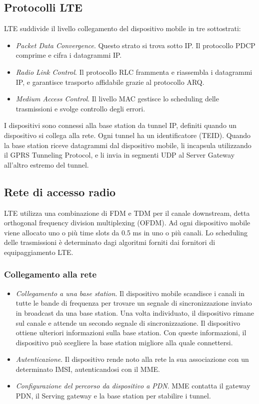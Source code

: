 \documentclass[11pt]{book}
\begin{document}
\subsection{Protocolli LTE}
LTE suddivide il livello collegamento del dispositivo mobile in tre sottostrati:
\begin{itemize}
    \item \textit{Packet Data Convergence}. Questo strato si trova sotto IP. Il protocollo PDCP comprime e cifra i datagrammi 
    IP.
    \item \textit{Radio Link Control}. Il protocollo RLC frammenta e riassembla i datagrammi IP, e garantisce trasporto 
    affidabile grazie al protocollo ARQ. 
    \item \textit{Medium Access Control}. Il livello MAC gestisce lo scheduling delle trasmissioni e svolge controllo degli 
    errori.
\end{itemize}
I dispositivi sono connessi alla base station da tunnel IP, definiti quando un dispositivo si collega alla rete. Ogni tunnel 
ha un identificatore (TEID). Quando la base station riceve datagrammi dal dispositivo mobile, li incapsula utilizzando il 
GPRS Tunneling Protocol, e li invia in segmenti UDP al Server Gateway all'altro estremo del tunnel.
\subsection{Rete di accesso radio}
LTE utilizza una combinazione di FDM e TDM per il canale downstream, detta orthogonal frequency division multiplexing (OFDM). 
Ad ogni dispositivo mobile viene allocato uno o più time slots da 0.5 ms in uno o più canali. Lo scheduling delle trasmissioni 
è determinato dagi algoritmi forniti dai fornitori di equipaggiamento LTE.
\subsubsection{Collegamento alla rete}
\begin{itemize}
    \item \textit{Collegamento a una base station}. Il dispositivo mobile scandisce i canali in tutte le bande di frequenza 
    per trovare un segnale di sincronizzazione inviato in broadcast da una base station. Una volta individuato, il dispositivo 
    rimane sul canale e attende un secondo segnale di sincronizzazione. Il dispositivo ottiene ulteriori informazioni sulla 
    base station. Con queste informazioni, il dispositivo può scegliere la base station migliore alla quale connettersi.
    \item \textit{Autenticazione}. Il dispositivo rende noto alla rete la sua associazione con un determinato IMSI, autenticandosi 
    con il MME.
    \item \textit{Configurazione del percorso da dispositivo a PDN}. MME contatta il gateway PDN, il Serving gateway e la 
    base station per stabilire i tunnel.
\end{itemize}
\end{document}
